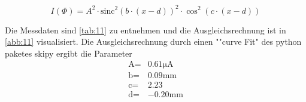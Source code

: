 \begin{equation}
    \label{eqn:10}
    I\left(\Phi\right) = A^2 \cdot \text{sinc}^2\left(b \cdot \left(x - d\right)\right) ^2 \cdot \cos^2{\left(c \cdot \left(x - d\right)\right)}
\end{equation}

Die Messdaten sind \autoref{tab:11} zu entnehmen und die Ausgleichsrechnung ist in \autoref{abb:11} visualisiert.
Die Ausgleichsrechnung durch einen ""curve Fit" des python paketes skipy ergibt die Parameter 
\begin{align}
    \text{A} = & 0.61 \unit{\micro\ampere} \\
    \text{b} = & 0.09 \unit{\milli\meter}\\
    \text{c} = & 2.23     \\
    \text{d} = & -0.20   \unit{\milli\meter}
\end{align}

